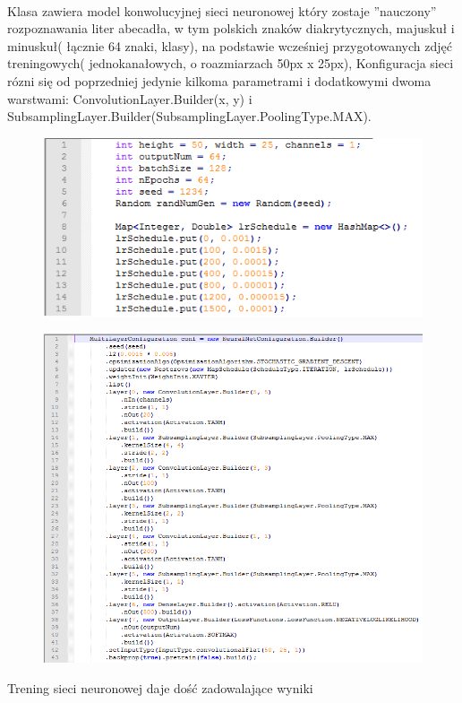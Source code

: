 \documentclass[a4paper,12pt]{article}
\begin{document}
            \paragraph{} Klasa zawiera model konwolucyjnej sieci neuronowej który           zostaje ''nauczony'' rozpoznawania liter abecadła, w tym polskich znaków     diakrytycznych, majuskuł i minuskuł( łącznie 64 znaki, klasy), na           podstawie wcześniej przygotowanych zdjęć treningowych( jednokanałowych,     o roazmiarzach 50px x 25px), Konfiguracja sieci rózni się od poprzedniej     jedynie kilkoma parametrami i dodatkowymi dwoma warstwami:                  ConvolutionLayer.Builder(x, y) i 
                SubsamplingLayer.Builder(SubsamplingLayer.PoolingType.MAX).
	       
	            \begin{figure}[!ht]  
	    	        \begin{center}
	    		        \includegraphics[width=15cm, frame] {image//practicalPart//cnnConf_01.png} 
	    	        \end{center}
		        \end{figure}
            
	            \begin{figure}[!ht]  
    		        \begin{center}
    			        \includegraphics[width=15cm, frame] {image//practicalPart//cnnConf_02.png} 
    		        \end{center}
		        \end{figure}            
            Trening sieci neuronowej daje dość zadowalające wyniki 
    
\end{document}
